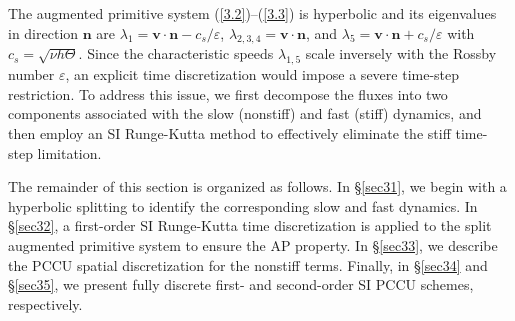 \documentclass[a4paper,11pt,twoside]{article}
\numberwithin{equation}{section}
\numberwithin{figure}{section}
\numberwithin{table}{section}
\newcommand{\eps}{\varepsilon}
\newcommand{\bn}{\bm{n}}
\newcommand{\bv}{\bm{v}}
\newcommand\eref[1]{(\ref{#1})}
\begin{document}
The augmented primitive system \eref{3.2}--\eref{3.3} is hyperbolic and its eigenvalues in direction $\bn$ are
$\lambda_1=\bv\cdot\bn-c_s/\eps$, $\lambda_{2,3,4}=\bv\cdot\bn$, and $\lambda_5=\bv\cdot\bn+c_s/\eps$ with $c_s=\sqrt{\nu h\Theta}$. Since
the characteristic speeds $\lambda_{1,5}$ scale inversely with the Rossby number $\eps$, an explicit time discretization would impose a
severe time-step restriction. To address this issue, we first decompose the fluxes into two components associated with the slow (nonstiff)
and fast (stiff) dynamics, and then employ an SI Runge-Kutta method to effectively eliminate the stiff time-step limitation.

The remainder of this section is organized as follows. In \S\ref{sec31}, we begin with a hyperbolic splitting to identify the corresponding 
slow and fast dynamics. In \S\ref{sec32}, a first-order SI Runge-Kutta time discretization is applied to the split augmented primitive
system to ensure the AP property. In \S\ref{sec33}, we describe the PCCU spatial discretization for the nonstiff terms. Finally, in
\S\ref{sec34} and \S\ref{sec35}, we present fully discrete first- and second-order SI PCCU schemes, respectively.
		
\end{document}
